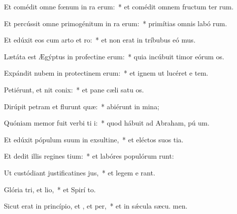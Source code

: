\item Et comédit omne fœnum in ra erum:~* et comédit omnem fructum ter rum.
\item Et percússit omne primogénitum in ra erum:~* primítias omnis labó rum.
\item Et edúxit eos cum arto et ro:~* et non erat in tríbubus eó mus.
\item Lætáta est Ægýptus in profectine erum:~* quia incúbuit timor eórum  os.
\item Expándit nubem in protectinem erum:~* et ignem ut lucéret e  tem.
\item Petiérunt, et nit conix:~* et pane cæli satu os.
\item Dirúpit petram et flurunt quæ:~* abiérunt in  mina;
\item Quóniam memor fuit verbi ti i:~* quod hábuit ad Abraham, pú um.
\item Et edúxit pópulum suum in exsultine,~* et eléctos suos  tia.
\item Et dedit illis regines tium:~* et labóres populórum runt:
\item Ut custódiant justificatines jus,~* et legem e rant.
\item Glória tri, et lio,~* et Spirí to.
\item Sicut erat in princípio, et , et per,~* et in sǽcula sæcu. men.
